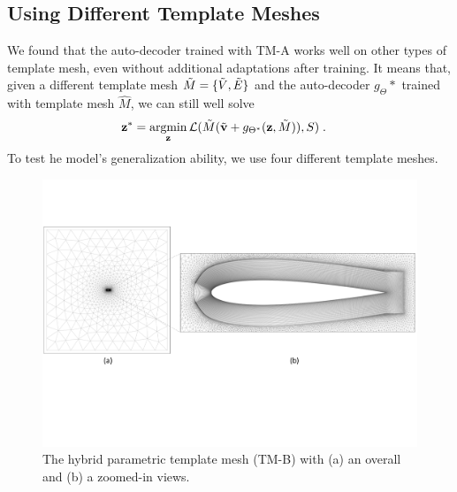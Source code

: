 \subsection{Using Different Template Meshes}
\label{ch3:sec:discussion_different_mesh}

We found that the auto-decoder trained with TM-A works well on other types of template mesh, even without additional adaptations after training.
It means that, given a different template mesh $\Tilde{M}=\{\Tilde{V}, \Tilde{E}\}$ and the auto-decoder $g_\Theta*$ trained with template mesh $\hat{M}$, we can still well solve
%
\begin{align}
    \bz^* &=  \argmin_{\bz} \cL(\Tilde{M}(\Tilde{\bv} + g_{\Theta^*}(\bz, \Tilde{M})) , S) \; .
\end{align}
%
To test he model's generalization ability, we use four different template meshes.

\begin{figure}[!tb]
	\begin{center}
		\includegraphics[width=1\linewidth]{chapter3/tex/figures/experiment/init_template_mesh_vlab.pdf}
	\end{center}
	\caption{ \small
		The hybrid parametric template mesh (TM-B) with (a) an overall and (b) a zoomed-in views.
	}
	\label{ch3:fig:discuss_init_vlab_mesh}
\end{figure}

